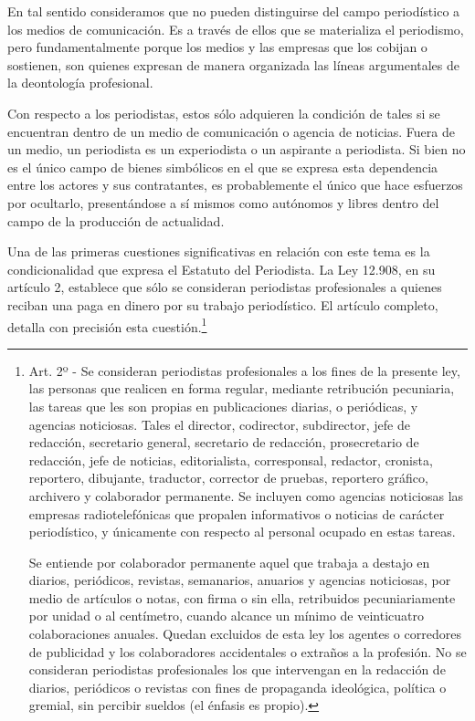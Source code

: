 {En tal sentido consideramos que no pueden distinguirse del campo periodístico a los medios de comunicación. Es a través de ellos que se materializa el periodismo, pero fundamentalmente porque los medios y las empresas que los cobijan o sostienen, son quienes expresan de manera organizada las líneas argumentales de la deontología profesional.

Con respecto a los periodistas, estos sólo adquieren la condición de tales si se encuentran dentro de un medio de comunicación o agencia de noticias. Fuera de un medio, un periodista es un experiodista o un aspirante a periodista. Si bien no es el único campo de bienes simbólicos en el que se expresa esta dependencia entre los actores y sus contratantes, es probablemente el único que hace esfuerzos por ocultarlo, presentándose a sí mismos como autónomos y libres dentro del campo de la producción de actualidad.

Una de las primeras cuestiones significativas en relación con este tema es la condicionalidad que expresa el Estatuto del Periodista. La Ley 12.908, en su artículo 2, establece que sólo se consideran periodistas profesionales a quienes reciban una paga en dinero por su trabajo periodístico. El artículo completo, detalla con precisión esta cuestión.\footnote{Art. 2º - Se consideran periodistas profesionales a los fines de la presente ley, las personas que realicen en forma regular, mediante retribución pecuniaria, las tareas que les son propias en publicaciones diarias, o periódicas, y agencias noticiosas. Tales el director, codirector, subdirector, jefe de redacción, secretario general, secretario de redacción, prosecretario de redacción, jefe de noticias, editorialista, corresponsal, redactor, cronista, reportero, dibujante, traductor, corrector de pruebas, reportero gráfico, archivero y colaborador permanente. Se incluyen como agencias noticiosas las empresas radiotelefónicas que propalen informativos o noticias de carácter periodístico, y únicamente con respecto al personal ocupado en estas tareas.

  Se entiende por colaborador permanente aquel que trabaja a destajo en diarios, periódicos, revistas, semanarios, anuarios y agencias noticiosas, por medio de artículos o notas, con firma o sin ella, retribuidos pecuniariamente por unidad o al centímetro, cuando alcance un mínimo de veinticuatro colaboraciones anuales. Quedan excluidos de esta ley los agentes o corredores de publicidad y los colaboradores accidentales o extraños a la profesión. No se consideran periodistas profesionales los que intervengan en la redacción de diarios, periódicos o revistas con fines de propaganda ideológica, política o gremial, sin percibir sueldos (el énfasis es propio).}

}
